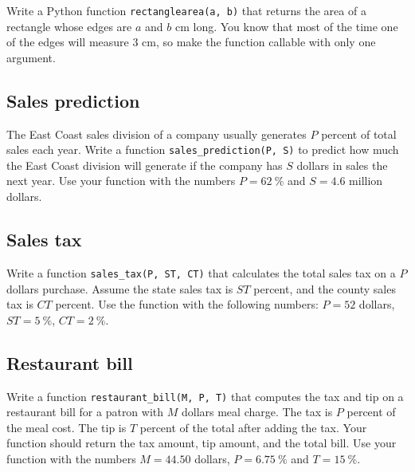 Write a Python function {\tt rectanglearea(a, b)} that returns the area of a rectangle 
whose edges are $a$ and $b$ cm long. You know that most of the time one of the edges 
will measure 3 cm, so make the function callable with only one argument.


\subsection{Sales prediction}

The East Coast sales division of a company usually generates $P$
percent of total sales each year. Write a function {\tt sales\_prediction(P, S)} to predict how much 
the East Coast division will generate if the company has $S$ dollars in sales the next year. 
Use your function with the numbers $P = 62\ \%$ and $S = 4.6$ million dollars. 


\subsection{Sales tax}

Write a function {\tt sales\_tax(P, ST, CT)} that calculates the total sales tax on a $P$ dollars purchase. 
Assume the state sales tax is $ST$ percent, and the county sales tax is $CT$ percent. Use the
function with the following numbers: $P = 52$ dollars, $ST = 5 \ \%$, $CT = 2 \ \%$.


\subsection{Restaurant bill}

Write a function {\tt restaurant\_bill(M, P, T)} 
that computes the tax and tip on a restaurant bill for a patron with 
$M$ dollars meal charge. The tax is $P$ percent of the meal cost. 
The tip is $T$ percent of the total after 
adding the tax. Your function should return the tax amount, tip amount, and the total bill. 
Use your function with the numbers $M = 44.50$ dollars, $P = 6.75 \ \%$ and $T = 15 \ \%$. 



